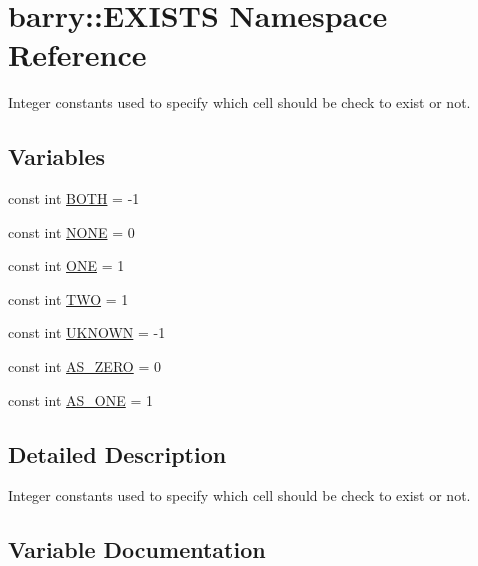 \hypertarget{namespacebarry_1_1_e_x_i_s_t_s}{}\section{barry\+:\+:E\+X\+I\+S\+TS Namespace Reference}
\label{namespacebarry_1_1_e_x_i_s_t_s}


Integer constants used to specify which cell should be check to exist or not.  


\subsection*{Variables}
\begin{DoxyCompactItemize}
\item 
const int \hyperlink{namespacebarry_1_1_e_x_i_s_t_s_aac36d54d92c9ec1d030e8c08d0594a47}{B\+O\+TH} = -\/1
\item 
const int \hyperlink{namespacebarry_1_1_e_x_i_s_t_s_a67dfa30940f84313c4936321298e5b1b}{N\+O\+NE} = 0
\item 
const int \hyperlink{namespacebarry_1_1_e_x_i_s_t_s_a9f25c9b3787f9e1cf03e28f5a6dbe725}{O\+NE} = 1
\item 
const int \hyperlink{namespacebarry_1_1_e_x_i_s_t_s_ac6cc1f304cbfc3576d15294cef82c868}{T\+WO} = 1
\item 
const int \hyperlink{namespacebarry_1_1_e_x_i_s_t_s_a95d6fdf6b1f3028fff8f2aef01f50f65}{U\+K\+N\+O\+WN} = -\/1
\item 
const int \hyperlink{namespacebarry_1_1_e_x_i_s_t_s_aa86651704b200b6bb125b289fb5b3cfc}{A\+S\+\_\+\+Z\+E\+RO} = 0
\item 
const int \hyperlink{namespacebarry_1_1_e_x_i_s_t_s_a5b06fbd1208ff2094213da0791609950}{A\+S\+\_\+\+O\+NE} = 1
\end{DoxyCompactItemize}


\subsection{Detailed Description}
Integer constants used to specify which cell should be check to exist or not. 

\subsection{Variable Documentation}
\mbox{\label{namespacebarry_1_1_e_x_i_s_t_s_a5b06fbd1208ff2094213da0791609950}} 
